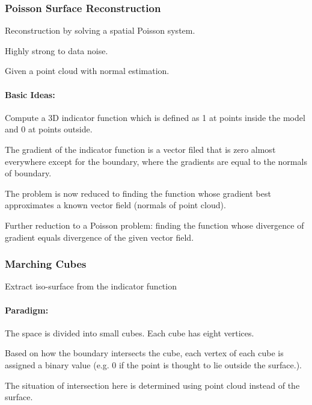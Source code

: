 \subsubsection*{Poisson Surface Reconstruction}


\begin{DoxyItemize}
\item Reconstruction by solving a spatial Poisson system.
\item Highly strong to data noise.
\item Given a point cloud with normal estimation.
\end{DoxyItemize}

\paragraph*{Basic Ideas\+:}


\begin{DoxyItemize}
\item Compute a 3D indicator function which is defined as 1 at points inside the model and 0 at points outside.
\item The gradient of the indicator function is a vector filed that is zero almost everywhere except for the boundary, where the gradients are equal to the normals of boundary.
\item The problem is now reduced to finding the function whose gradient best approximates a known vector field (normals of point cloud).
\item Further reduction to a Poisson problem\+: finding the function whose divergence of gradient equals divergence of the given vector field. 


\end{DoxyItemize}

\subsubsection*{Marching Cubes}


\begin{DoxyItemize}
\item Extract iso-\/surface from the indicator function
\end{DoxyItemize}

\paragraph*{Paradigm\+:}


\begin{DoxyEnumerate}
\item The space is divided into small cubes. Each cube has eight vertices.
\item Based on how the boundary intersects the cube, each vertex of each cube is assigned a binary value (e.\+g. 0 if the point is thought to lie outside the surface.).
\item The situation of intersection here is determined using point cloud instead of the surface. 
\end{DoxyEnumerate}